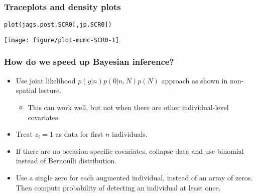 \documentclass[color=usenames,dvipsnames]{beamer}\usepackage[]{graphicx}\usepackage[]{color}
\makeatletter
\newcommand{\hlstd}[1]{\textcolor[rgb]{0,0,0}{#1}}%
\newcommand{\hlkwd}[1]{\textcolor[rgb]{0.004,0.004,0.506}{#1}}%
\newenvironment{kframe}{%
 \def\at@end@of@kframe{}%
 \ifinner\ifhmode%
  \def\at@end@of@kframe{\end{minipage}}%
  \begin{minipage}{\columnwidth}%
 \fi\fi%
 \def\FrameCommand##1{\hskip\@totalleftmargin \hskip-\fboxsep
 \colorbox{shadecolor}{##1}\hskip-\fboxsep
     \hskip-\linewidth \hskip-\@totalleftmargin \hskip\columnwidth}%
 \MakeFramed {\advance\hsize-\width
   \@totalleftmargin\z@ \linewidth\hsize
   \@setminipage}}%
 {\par\unskip\endMakeFramed%
 \at@end@of@kframe}
\newenvironment{knitrout}{}{} %
\makeatother
\begin{document}
\begin{frame}[fragile]
  \frametitle{Traceplots and density plots}
\begin{knitrout}\footnotesize
{}\color{fgcolor}\begin{kframe}
\begin{alltt}
\hlkwd{plot}\hlstd{(jags.post.SCR0[,jp.SCR0])}
\end{alltt}
\end{kframe}

{\centering \texttt{[image: figure/plot-mcmc-SCR0-1]} 

}



\end{knitrout}
\end{frame}


\begin{frame}
  \frametitle{How do we speed up Bayesian inference?}
  \begin{itemize}
    \item Use joint likelihood $p(y|n)p(0|n,N)p(N)$ approach as shown in
      non-spatial lecture.
      \begin{itemize}
        \item This can work well, but not when there are other
          individual-level covariates.
      \end{itemize}
    \item Treat $z_i=1$ as data for first $n$ individuals.
    \item If there are no occasion-specific covariates, collapse data
      and use binomial instead of Bernoulli distribution.
    \item Use a single zero for each augmented individual, instead of
      an array of zeros. Then compute probability of detecting an
      individual at least once.
  \end{itemize}
\end{frame}
\end{document}
